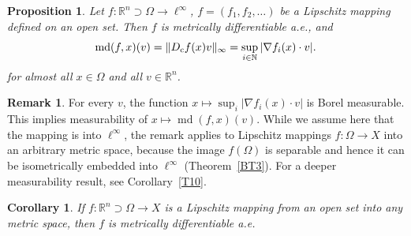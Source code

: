 \documentclass[12pt,leqno]{amsart}
\newtheorem{corollary}[theorem]{Corollary}
\newtheorem{proposition}[theorem]{Proposition}
\theoremstyle{definition}
\newtheorem{remark}[theorem]{Remark}
\newcommand{\bbbn}{\mathbb N}
\newcommand{\bbbr}{\mathbb R}
\def\md{\operatorname{md}}
\numberwithin{theorem}{section} \numberwithin{equation}{section}
\begin{document}
\begin{proposition}
\label{MDT2}
Let $f:\bbbr^n\supset\Omega\to\ell^\infty$, $f=(f_1,f_2,\ldots)$ be a Lipschitz mapping defined on an open set. Then $f$ is metrically differentiable a.e., and
$$
\md (f,x)(v)=\Vert D_{\rm c}f(x)v\Vert_\infty=\sup_{i\in\bbbn}|\nabla f_i(x)\cdot v|.
$$
for almost all $x\in\Omega$ and all $v\in\bbbr^n$.
\end{proposition}
\begin{remark}
\label{Rem1}
For every $v$, the function $x\mapsto\sup_i|\nabla f_i(x)\cdot v|$ is Borel measurable. This implies measurability of $x\mapsto\md(f,x)(v)$. While we assume here that the mapping is into $\ell^\infty$, the remark applies to Lipschitz mappings $f:\Omega\to X$ into an arbitrary metric space, because the image $f(\Omega)$ is separable and hence it can be isometrically embedded into $\ell^\infty$ (Theorem~\ref{BT3}).
For a deeper measurability result, see Corollary~\ref{T10}.
\end{remark}
\begin{corollary}
\label{MDT3}
If $f:\bbbr^n\supset\Omega\to X$ is a Lipschitz mapping from an open set into any metric space, then $f$ is metrically differentiable a.e.
\end{corollary}
\end{document}
